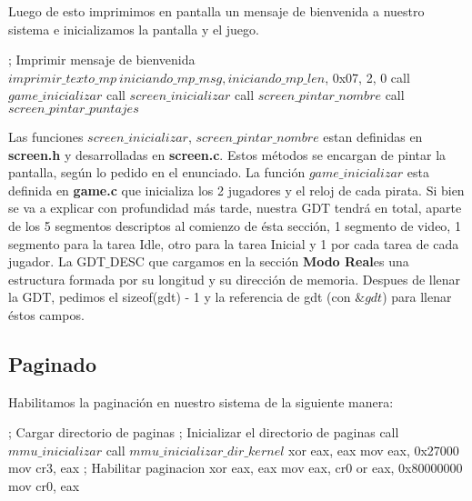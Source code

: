 Luego de esto imprimimos en pantalla un mensaje de bienvenida a nuestro sistema e inicializamos la pantalla y el juego.
\begin{algorithmic}
    \State \tab \tab ; Imprimir mensaje de bienvenida
    \State \tab \tab $imprimir\_texto\_mp \ iniciando\_mp\_msg, iniciando\_mp\_len$, 0x07, 2, 0
    \State \tab \tab call $game\_inicializar$
    \State \tab \tab call $screen\_inicializar$
    \State \tab \tab call $screen\_pintar\_nombre$
    \State \tab \tab call $screen\_pintar\_puntajes$
\end{algorithmic}

Las funciones \textit{$screen\_inicializar$}, \textit{$screen\_pintar\_nombre$} estan definidas en \textbf{screen.h} y desarrolladas en \textbf{screen.c}. Estos m\'etodos se encargan de pintar la pantalla, seg\'un lo pedido en el enunciado. La función \textit{$game\_inicializar$} esta definida en \textbf{game.c} que inicializa los 2 jugadores y el reloj de cada pirata.
Si bien se va a explicar con profundidad más tarde, nuestra GDT tendrá en total, aparte de los 5 segmentos descriptos al comienzo de ésta sección, 1 segmento de video, 1 segmento para la tarea Idle, otro para la tarea Inicial y 1 por cada tarea de cada jugador.
La GDT$\_$DESC que cargamos en la sección \textbf{Modo Real}es una estructura formada por su longitud y su dirección de memoria. Despues de llenar la GDT, pedimos el sizeof(gdt) - 1 y la referencia de gdt (con $\&gdt$) para llenar éstos campos.

\subsection{Paginado}
Habilitamos la paginaci\'on en nuestro sistema de la siguiente manera:
\begin{algorithmic}
    \State \tab ; Cargar directorio de paginas
    \State \tab ; Inicializar el directorio de paginas
    \State \tab call $mmu\_inicializar$
    \State \tab call $mmu\_inicializar\_dir\_kernel$
    \State \tab xor eax, eax
    \State \tab mov eax, 0x27000
    \State \tab mov cr3, eax
    \State \tab ; Habilitar paginacion
    \State \tab xor eax, eax
    \State \tab mov eax, cr0
    \State \tab or eax, 0x80000000
    \State \tab mov cr0, eax
\end{algorithmic}

